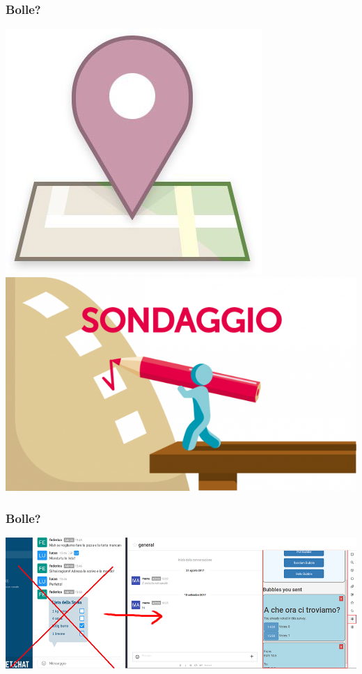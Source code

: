 \begin{frame}
	\frametitle{Bolle?}
    \begin{center}
        \includegraphics[scale=0.30]{img/posizione.jpg} 
        \includegraphics[scale=0.25]{img/sondaggio.png} \\
    \end{center}
\end{frame}

\begin{frame}
	\frametitle{Bolle?}
    \begin{center}
        \includegraphics[scale=0.35]{img/f.png} \\
    \end{center}
\end{frame}

